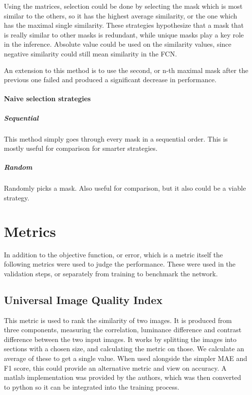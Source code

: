 \documentclass[12pt]{report}
\begin{document}
Using the matrices, selection could be done by selecting the mask which is most similar to the others, so it has the highest average similarity, or the one which has the maximal single similarity. These strategies hypothesize that a mask that is really similar to other masks is redundant, while unique masks play a key role in the inference. Absolute value could be used on the similarity values, since negative similarity could still mean similarity in the FCN.

An extension to this method is to use the second, or n-th maximal mask after the previous one failed and produced a significant decrease in performance.
\subsubsection{Naive selection strategies}
\paragraph{Sequential}This method simply goes through every mask in a sequential order. This is mostly useful for comparison for smarter strategies.
\paragraph{Random}
Randomly picks a mask. Also useful for comparison, but it also could be a viable strategy.
\chapter{Metrics}
In addition to the objective function, or error, which is a metric itself the following metrics were used to judge the performance. These were used in the validation steps, or separately from training to benchmark the network.
\section{Universal Image Quality Index}This metric is used to rank the similarity of two images. It is produced from three components, measuring the correlation, luminance difference and contrast difference between the two input images. It works by splitting the images into sections with a chosen size, and calculating the metric on those. We calculate an average of these to get a single value. When used alongside the simpler MAE and F1 score, this could provide an alternative metric and view on accuracy. A matlab implementation was provided by the authors, which was then converted to python so it can be integrated into the training process.
\end{document}
